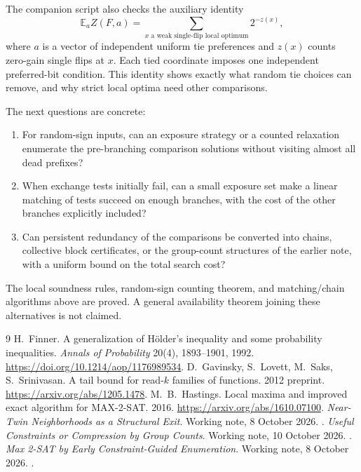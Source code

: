\documentclass[11pt,a4paper]{article}
\theoremstyle{remark}
\newcommand{\E}{\mathbb E}
\begin{document}
\newpage
The companion script also checks
the auxiliary identity
\[
 \E_a Z(F,a)=\sum_{x\text{ a weak single-flip local optimum}}2^{-z(x)},
\]
where $a$ is a vector of independent uniform tie preferences and $z(x)$
counts zero-gain single flips at $x$. Each tied coordinate imposes one
independent preferred-bit condition. This identity shows exactly what
random tie choices can remove, and why strict local optima need other
comparisons.

The next questions are concrete:
\begin{enumerate}
\item For random-sign inputs, can an exposure strategy or a counted
relaxation enumerate the pre-branching comparison solutions without
visiting almost all dead prefixes?
\item When exchange tests initially fail, can a small exposure set make
a linear matching of tests succeed on enough branches, with the cost
of the other branches explicitly included?
\item Can persistent redundancy of the comparisons be converted into
chains, collective block certificates, or the group-count structures of
the earlier note, with a uniform bound on the total search cost?
\end{enumerate}
The local soundness rules, random-sign counting theorem, and matching/chain
algorithms above are proved. A general availability theorem joining
these alternatives is not claimed.

\begin{thebibliography}{9}
 H.~Finner. A generalization of H\"older's inequality and
some probability inequalities. \emph{Annals of Probability} 20(4),
1893--1901, 1992. \url{https://doi.org/10.1214/aop/1176989534}.
 D.~Gavinsky, S.~Lovett, M.~Saks, S.~Srinivasan.
A tail bound for read-$k$ families of functions. 2012 preprint.
\url{https://arxiv.org/abs/1205.1478}.
 M.~B.~Hastings. Local maxima and improved exact algorithm
for MAX-2-SAT. 2016. \url{https://arxiv.org/abs/1610.07100}.
 \emph{Near-Twin Neighborhoods as a Structural Exit}.
Working note, 8 October 2026. .
 \emph{Useful Constraints or Compression by Group Counts}.
Working note, 10 October 2026.
.
 \emph{Max 2-SAT by Early Constraint-Guided Enumeration}.
Working note, 8 October 2026. .
\end{thebibliography}
\end{document}
